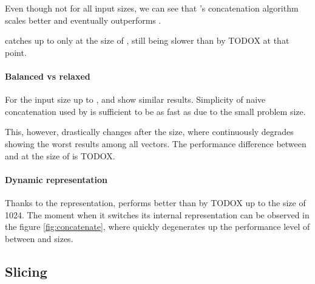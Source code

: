 Even though not for all input sizes, we can see that \rrbvec{}'s concatenation algorithm scales better and eventually outperforms \stdvec{}.

\imrsvec{} catches up to \stdvec{} only at the size of , still being slower than \rrbvec{} by TODOX at that point.

\paragraph{Balanced vs relaxed}
For the input size up to , \rbvec{} and \rrbvec{} show similar results. Simplicity of naive concatenation used by \rbvec{} is sufficient to be as fast as \rrbvec{} due to the small problem size.

This, however, drastically changes after the  size, where \rbvec{} continuously degrades showing the worst results among all vectors. The performance difference between \rbvec{} and \rrbvec{} at the size of  is TODOX.

\paragraph{Dynamic representation}
Thanks to the \stdvec{} representation, \pvec{} performs better than \rrbvec{} by TODOX up to the size of 1024. The moment when it switches its internal representation can be observed in the figure \ref{fig:concatenate}, where \pvec{} quickly degenerates up the performance level of \rrbvec{} between  and  sizes.


\subsection{Slicing}

